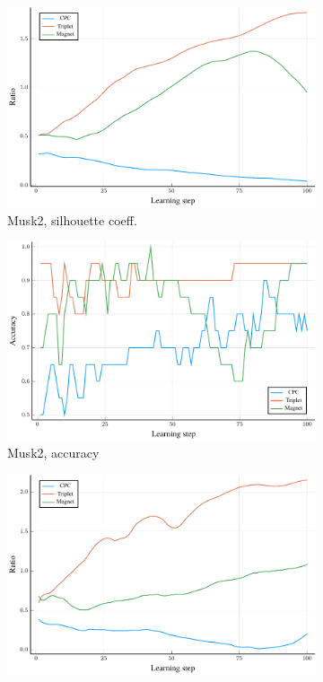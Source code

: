 \begin{figure}
  \centering
  \begin{subfigure}[t]{0.49\textwidth}
    \centering
    \includegraphics[width=\textwidth]{images/Musk2_ratio/Musk2_ratio.pdf}
    \caption{Musk2, silhouette coeff.}
  \end{subfigure}
  \begin{subfigure}[t]{0.49\textwidth}
    \centering
    \includegraphics[width=\textwidth]{images/Musk2_accuracy/Musk2_accuracy.pdf}
    \caption{Musk2, accuracy}
  \end{subfigure}
  \begin{subfigure}[t]{0.49\textwidth}
    \centering
    \includegraphics[width=\textwidth]{images/UCSBBreastCancer_ratio/UCSBBreastCancer_ratio.pdf}

\end{subfigure}
\end{figure}
